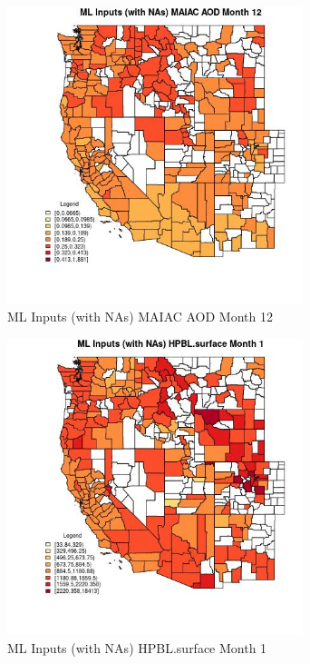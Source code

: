 \begin{figure} 
\centering  
\includegraphics[width=0.77\textwidth]{Code_Outputs/Report_ML_input_PM25_Step4_part_f_de_duplicated_aveswNAs_CountyMAIAC_AODmedianMonth12.jpg} 
\caption{\label{fig:Report_ML_input_PM25_Step4_part_f_de_duplicated_aveswNAsCountyMAIAC_AODmedianMonth12}ML Inputs (with NAs) MAIAC AOD Month 12} 
\end{figure} 
 

\begin{figure} 
\centering  
\includegraphics[width=0.77\textwidth]{Code_Outputs/Report_ML_input_PM25_Step4_part_f_de_duplicated_aveswNAs_CountyHPBLsurfacemedianMonth1.jpg} 
\caption{\label{fig:Report_ML_input_PM25_Step4_part_f_de_duplicated_aveswNAsCountyHPBLsurfacemedianMonth1}ML Inputs (with NAs) HPBL.surface Month 1} 
\end{figure} 
 

